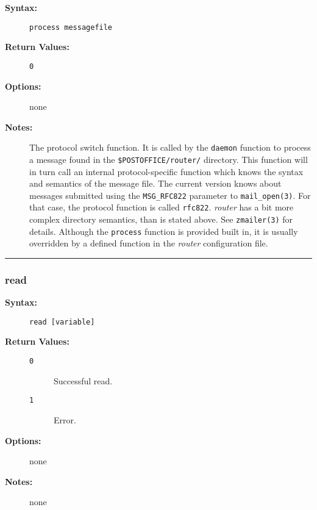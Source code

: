 \begin{description}
\item[{\bf Syntax:}] \mbox{}

{\tt process messagefile}

\item[{\bf Return Values:}] \mbox{}

\begin{description}
\item[{\tt 0}] \mbox{}



\end{description}


\item[{\bf Options:}] \mbox{}

none  

\item[{\bf Notes:}] \mbox{}

The protocol switch function. It is called by
the {\tt daemon} function to process a message found in the 
{\tt \$POSTOFFICE/router/} directory. This function will 
in turn call an internal protocol-specific function which knows the 
syntax and semantics of the message file. The current version knows 
about messages submitted using the {\tt MSG\_RFC822} parameter to 
{\tt mail\_open(3)}. For that case, the protocol function is called 
{\tt rfc822}. {\em router\/} has a bit more complex directory 
semantics, than is stated above. See {\tt zmailer(3)} for details. 
Although the {\tt process} function is provided built in, it is 
usually overridden by a defined function in the {\em router\/} 
configuration file.

\end{description}


\hrule
\subsubsection{read}

\begin{description}
\item[{\bf Syntax:}] \mbox{}

{\tt read [variable]}

\item[{\bf Return Values:}] \mbox{}

\begin{description}
\item[{\tt 0}] \mbox{}

Successful read.

\item[{\tt 1}] \mbox{}

Error.

\end{description}


\item[{\bf Options:}] \mbox{}

none  

\item[{\bf Notes:}] \mbox{}

none  

\end{description}


